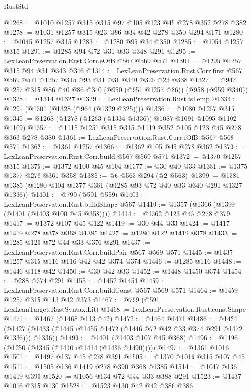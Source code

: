 \begin{lexlean}{RustStd}
\begin{coremodule}
@1268 := @1010 @1257 @315 @315 @97 @105 @123 @45 @278 @352 @278 @382
@1278 := @1031 @1257 @315 @23 @96 @34 @42 @278 @350 @294 @171
@1280 := @1045 @1257 @315
@1283 := @1280 @96 @34 @350
@1285 := @1054 @1257 @315
@1291 := @1285 @94 @72 @31 @33 @348 @291
@1295 := LexLeanPreservation.Rust.Corr.eOfB @567 @569 @571
@1301 := @1295 @1257 @315 @94 @31 @343 @346
@1314 := LexLeanPreservation.Rust.Corr.first
    @567
    @569
    @571
    @1257
    @315
    @93
    @31
    @31
    @340
    @325
    @23
    @338
@1327 := @942 @1257 @315 @86 @40 @86 @340 (@950 (@951 @1257 @86)) (@958 (@959 @340))
@1328 := @1314 @1327
@1329 := LexLeanPreservation.Rust.isTemp
@1334 := @1291 (@1301 (@1328 (@964 (@1329 @325))))
@1336 := @1080 @1257 @315
@1345 := @1268 (@1278 (@1283 (@1334 @1336)) @1087 @1091 @1095 @1102 @1109)
@1357 := @1115 @1257 @315 @315 @1119 @352 @105 @123 @45 @278 @363 @278 @380
@1361 := LexLeanPreservation.Rust.Corr.fOfB @567 @569 @571
@1362 := @1361 @1257
@1366 := @1362 @105 @45 @278 @362
@1370 := LexLeanPreservation.Rust.Corr.build @567 @569 @571
@1372 := @1370 @1257 @315
@1375 := @1372 @100 @45 @104
@1377 := @30 @40 @33
@1381 := @1375 @1377 @278 @361 @358
@1385 := @6 @563 @294 (@2 @563)
@1399 := @1381 @1385 (@1280 @104 @1377 @361 (@1285 @93 @72 @40 @33 @340 @291 @1327 @1336))
@1401 := @799 (@591 @559)
@1403 := LexLeanPreservation.Rust.buildShape @567
@1410 := @1357 (@1366 (@1399 (@1401 (@1403 @100 @45 @358))))
@1414 := @1362 @123 @45 @278 @379
@1417 := @1372 @107 @45 @122
@1419 := @30 @44 @33
@1424 := @1417 @1419 @278 @378 @368 @1385
@1427 := @1280 @122 @1419 @378
@1433 := @1285 @120 @72 @44 @33 @376 @291
@1437 := LexLeanPreservation.Rust.Corr.buildPair @567 @569 @571
@1445 := @1437 @1257 @315 @116 @116 @42 @42 @374 @374
@1446 := @1285 @116
@1448 := @1446 @118 @42
@1450 := @30 @42 @33
@1452 := @1448 @1450 @374
@1454 := @288 @374 @291
@1455 := @1452 @1454
@1459 := LexLeanPreservation.Rust.Corr.buildConst @567 @569 @571
@1464 := @1459 @1257 @315 @113 @42 @373
@1467 := @799 (@591 LexLeanTarget.RustSyntax.Lit)
@1468 := LexLeanPreservation.Rust.constShape
@1471 := @1467 (@1468 @113 @42)
@1472 := @1464 @1471
@1486 := @1424 (@1427 (@1433 (@1445 (@1455 @1472 (@1446 @72 @42 @33 @374 @291 @1472 @1336))) @1336))
@1490 := @1401 (@1403 @107 @45 @368)
@1496 := @1196 (@1250 (@1345 (@1410 (@1414 (@1486 @1490)))))
@1497 := @1361 @1016
@1501 := @1497 @137 @45 @278 @391
@1505 := @1370 @1016 @315 @107 @45
@1511 := @1505 @136 @1419 @278 @390 @368 @1385
@1514 := @1047 @136 @1419 @390
@1520 := @1056 @134 @72 @44 @33 @388 @291
@1523 := @1437 @1016 @315 @130
@1528 := @1523 @130 @42 @42 @386 @386

\end{coremodule}
\end{lexlean}
